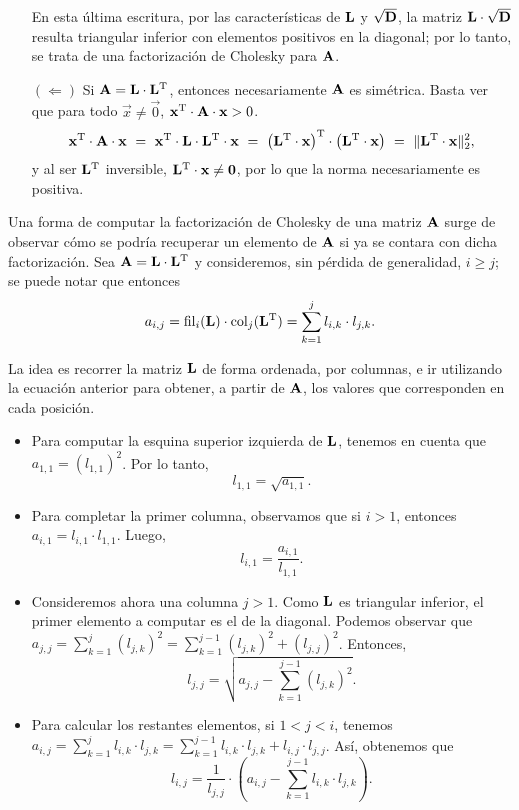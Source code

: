 \begin{itemize}
    En esta última escritura, por las características de $\mathbf{L}$ y
    $\mathbf{\sqrt{D}}$, la matriz $\mathbf{L} \cdot \mathbf{\sqrt{D}}$ resulta
    triangular inferior con elementos positivos en la diagonal; por lo tanto,
    se trata de una factorización de Cholesky para $\mathbf{A}$.

\item[$(\Leftarrow)$] Si $\mathbf{A} = \mathbf{L} \cdot \mathbf{L}^{\mathrm{T}}$, entonces
    necesariamente $\mathbf{A}$ es simétrica. Basta ver que para todo $\vec{x}
    \neq \vec{0}$, $\mathbf{x}^{\mathrm{T}} \cdot \mathbf{A} \cdot \mathbf{x} > 0$.
    \[ \mathbf{x}^{\mathrm{T}} \cdot \mathbf{A} \cdot \mathbf{x}
        \ = \ \mathbf{x}^{\mathrm{T}} \cdot \mathbf{L} \cdot \mathbf{L}^{\mathrm{T}} \cdot \mathbf{x}
        \ = \ \left( \mathbf{L}^{\mathrm{T}} \cdot \mathbf{x} \right)^{\mathrm{T}} \cdot
            \left( \mathbf{L}^{\mathrm{T}} \cdot \mathbf{x} \right)
        \ = \ \Vert \mathbf{L}^{\mathrm{T}} \cdot \mathbf{x} \Vert_2^2, \]
    y al ser $\mathbf{L}^{\mathrm{T}}$ inversible,
    $\mathbf{L}^{\mathrm{T}} \cdot \mathbf{x} \neq \mathbf{0}$,
    por lo que la norma necesariamente es positiva.  
\end{itemize}

Una forma de computar la factorización de Cholesky de una matriz $\mathbf{A}$
surge de observar cómo se podría recuperar un elemento de $\mathbf{A}$ si ya
se contara con dicha factorización. Sea $\mathbf{A} = \mathbf{L} \cdot
\mathbf{L}^{\mathrm{T}}$ y consideremos, sin pérdida de generalidad, $i \geq j$; se puede notar que entonces
\[ a_{i,j} = \operatorname{fil}_i(\mathbf{L}) \cdot \operatorname{col}_j(\mathbf{L}^{\mathrm{T}})
           = \sum_{k=1}^j l_{i,k} \cdot l_{j,k}. \]

La idea es recorrer la matriz $\mathbf{L}$ de forma ordenada, por columnas,
e ir utilizando la ecuación anterior para obtener, a partir de $\mathbf{A}$,
los valores que corresponden en cada posición.
\begin{itemize}
\item Para computar la esquina superior izquierda de $\mathbf{L}$, tenemos en
    cuenta que $a_{1,1} = (l_{1,1})^2$. Por lo tanto,
        \[ l_{1,1} = \sqrt{a_{1,1}}. \]
\item Para completar la primer columna, observamos que si $i > 1$, entonces
    $a_{i,1} = l_{i,1} \cdot l_{1,1}$. Luego,
    \[ l_{i,1} = \frac{a_{i,1}}{l_{1,1}}. \]
\item Consideremos ahora una columna $j > 1$. Como $\mathbf{L}$ es triangular
    inferior, el primer elemento a computar es el de la diagonal. Podemos
    observar que $a_{j,j} = \sum_{k=1}^j (l_{j,k})^2 =
    \sum_{k=1}^{j-1} (l_{j,k})^2 + (l_{j,j})^2$. Entonces,
    \[ l_{j,j} = \sqrt{a_{j,j} - \sum_{k=1}^{j-1} (l_{j,k})^2}. \]
\item Para calcular los restantes elementos, si $1 < j < i$, tenemos
    $a_{i,j} = \sum_{k=1}^j l_{i,k} \cdot l_{j,k} =
    \sum_{k=1}^{j-1} l_{i,k} \cdot l_{j,k} + l_{i,j} \cdot l_{j,j}$. Así,
    obtenemos que
    \[ l_{i,j} = \frac{1}{l_{j,j}} \cdot
        \left( a_{i,j} - \sum_{k=1}^{j-1} l_{i,k} \cdot l_{j,k} \right). \]
\end{itemize}

